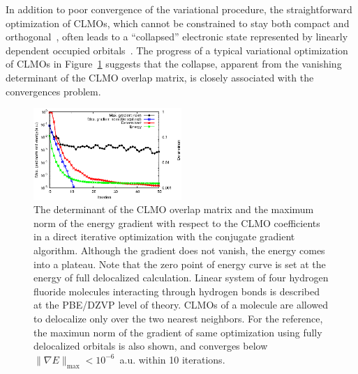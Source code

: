\documentclass[aps,prl,twocolumn,reprint,amsmath,amssymb]{revtex4-1}
\begin{document}
%
In addition to poor convergence of the variational procedure, the straightforward optimization of CLMOs, which cannot be constrained to stay both compact and orthogonal~\cite{stoll1980use, RZZK}, often leads to a ``collapsed'' electronic state represented by linearly dependent occupied orbitals~\cite{ordejon1995linear}. 
%
The progress of a typical variational optimization of CLMOs in Figure~\ref{fig:det} suggests that the collapse, apparent from the vanishing determinant of the CLMO overlap matrix, is closely associated with the convergences problem.


\begin{figure}
\includegraphics[width=0.5\textwidth]{det}
\caption{
The determinant of the CLMO overlap matrix and the maximum norm of the energy gradient with respect to the CLMO coefficients in a direct iterative optimization with the conjugate gradient algorithm. Although the gradient does not vanish, the energy comes into a plateau. Note that the zero point of energy curve is set at the energy of full delocalized calculation. Linear system of four hydrogen fluoride molecules interacting through hydrogen bonds is described at the PBE/DZVP level of theory. CLMOs of a molecule are allowed to delocalize only over the two nearest neighbors. For the reference, the maximun norm of the gradient of same optimization using fully delocalized orbitals is also shown, and converges below $\| \nabla E \|_{\text{max}} < 10^{-6}$~a.u. within 10 iterations.}
\label{fig:det}
\end{figure}
\end{document}
